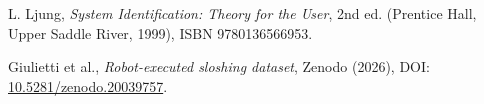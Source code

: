 L. Ljung, \emph{System Identification: Theory for the User}, 2nd ed.
(Prentice Hall, Upper Saddle River, 1999), ISBN 9780136566953.

Giulietti et al., \emph{Robot-executed sloshing dataset},
Zenodo (2026), DOI: \href{https://doi.org/10.5281/zenodo.20039757}{10.5281/zenodo.20039757}.
